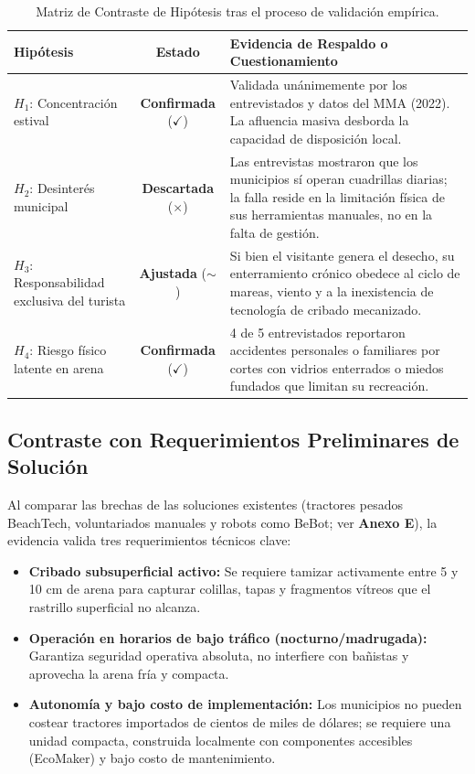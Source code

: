 \documentclass[12pt,letterpaper]{article}
\begin{document}
\begin{table}[h!]
\centering
\footnotesize
{}
\begin{tabularx}{\textwidth}{p{2.6cm} c X}
\toprule
\textbf{Hipótesis} & \textbf{Estado} & \textbf{Evidencia de Respaldo o Cuestionamiento} \\
\midrule
$H_1$: Concentración estival & \textbf{Confirmada} ($\checkmark$) & Validada unánimemente por los entrevistados y datos del MMA (2022). La afluencia masiva desborda la capacidad de disposición local. \\
\addlinespace[2pt]
$H_2$: Desinterés municipal & \textbf{Descartada} ($\times$) & Las entrevistas mostraron que los municipios sí operan cuadrillas diarias; la falla reside en la limitación física de sus herramientas manuales, no en la falta de gestión. \\
\addlinespace[2pt]
$H_3$: Responsabilidad exclusiva del turista & \textbf{Ajustada} ($\sim$) & Si bien el visitante genera el desecho, su enterramiento crónico obedece al ciclo de mareas, viento y a la inexistencia de tecnología de cribado mecanizado. \\
\addlinespace[2pt]
$H_4$: Riesgo físico latente en arena & \textbf{Confirmada} ($\checkmark$) & 4 de 5 entrevistados reportaron accidentes personales o familiares por cortes con vidrios enterrados o miedos fundados que limitan su recreación. \\
\bottomrule
\end{tabularx}
\caption{Matriz de Contraste de Hipótesis tras el proceso de validación empírica.}
\label{tab:hipotesis}
\end{table}

\subsection{Contraste con Requerimientos Preliminares de Solución}
Al comparar las brechas de las soluciones existentes (tractores pesados BeachTech, voluntariados manuales y robots como BeBot; ver \textbf{Anexo E}), la evidencia valida tres requerimientos técnicos clave:
\begin{itemize}[leftmargin=*, noitemsep, topsep=0pt]
    \item \textbf{Cribado subsuperficial activo:} Se requiere tamizar activamente entre 5 y 10 cm de arena para capturar colillas, tapas y fragmentos vítreos que el rastrillo superficial no alcanza.
    \item \textbf{Operación en horarios de bajo tráfico (nocturno/madrugada):} Garantiza seguridad operativa absoluta, no interfiere con bañistas y aprovecha la arena fría y compacta.
    \item \textbf{Autonomía y bajo costo de implementación:} Los municipios no pueden costear tractores importados de cientos de miles de dólares; se requiere una unidad compacta, construida localmente con componentes accesibles (EcoMaker) y bajo costo de mantenimiento.
\end{itemize}
\end{document}

